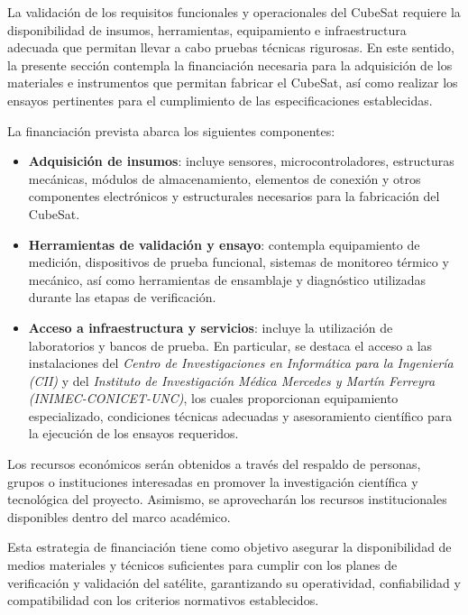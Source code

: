   La validaci\'on de los requisitos funcionales y operacionales del CubeSat requiere la disponibilidad de insumos, herramientas, equipamiento e infraestructura adecuada que permitan llevar a cabo pruebas t\'ecnicas rigurosas. En este sentido, la presente secci\'on contempla la financiaci\'on necesaria para la adquisici\'on de los materiales e instrumentos que permitan fabricar el CubeSat, as\'i como realizar los ensayos pertinentes para el cumplimiento de las especificaciones establecidas.

  La financiaci\'on prevista abarca los siguientes componentes:

  \begin{itemize}
    \item \textbf{Adquisici\'on de insumos}: incluye sensores, microcontroladores, estructuras mec\'anicas, m\'odulos de almacenamiento, elementos de conexi\'on y otros componentes electr\'onicos y estructurales necesarios para la fabricaci\'on del CubeSat.
    \item \textbf{Herramientas de validaci\'on y ensayo}: contempla equipamiento de medici\'on, dispositivos de prueba funcional, sistemas de monitoreo t\'ermico y mec\'anico, as\'i como herramientas de ensamblaje y diagn\'ostico utilizadas durante las etapas de verificaci\'on.
    \item \textbf{Acceso a infraestructura y servicios}: incluye la utilizaci\'on de laboratorios y bancos de prueba. En particular, se destaca el acceso a las instalaciones del \textit{Centro de Investigaciones en Inform\'atica para la Ingenier\'ia (CII)} y del \textit{Instituto de Investigaci\'on M\'edica Mercedes y Mart\'in Ferreyra (INIMEC-CONICET-UNC)}, los cuales proporcionan equipamiento especializado, condiciones t\'ecnicas adecuadas y asesoramiento cient\'ifico para la ejecuci\'on de los ensayos requeridos.
  \end{itemize}

  Los recursos econ\'omicos ser\'an obtenidos a trav\'es del respaldo de personas, grupos o instituciones interesadas en promover la investigaci\'on cient\'ifica y tecnol\'ogica del proyecto. Asimismo, se aprovechar\'an los recursos institucionales disponibles dentro del marco acad\'emico.

  Esta estrategia de financiaci\'on tiene como objetivo asegurar la disponibilidad de medios materiales y t\'ecnicos suficientes para cumplir con los planes de verificaci\'on y validaci\'on del sat\'elite, garantizando su operatividad, confiabilidad y compatibilidad con los criterios normativos establecidos.

